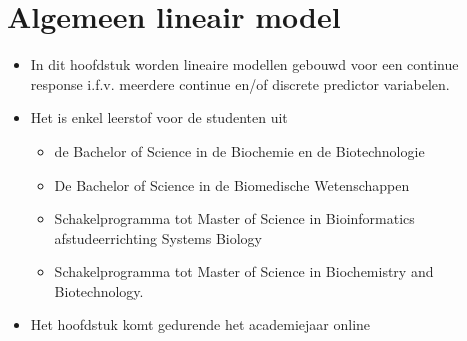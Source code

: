 \documentclass[12pt,dutch,coursenotes]{book}
\providecommand{\tightlist}{%
  \setlength{\itemsep}{0pt}\setlength{\parskip}{0pt}}
\theoremstyle{definition}
\theoremstyle{definition}
\theoremstyle{definition}
\theoremstyle{remark}
\begin{document}
\chapter{Algemeen lineair model}\label{chap:glm}

\begin{itemize}
\tightlist
\item
  In dit hoofdstuk worden lineaire modellen gebouwd voor een continue
  response i.f.v. meerdere continue en/of discrete predictor variabelen.
\item
  Het is enkel leerstof voor de studenten uit

  \begin{itemize}
  \tightlist
  \item
    de Bachelor of Science in de Biochemie en de Biotechnologie
  \item
    De Bachelor of Science in de Biomedische Wetenschappen
  \item
    Schakelprogramma tot Master of Science in Bioinformatics
    afstudeerrichting Systems Biology
  \item
    Schakelprogramma tot Master of Science in Biochemistry and
    Biotechnology.
  \end{itemize}
\item
  Het hoofdstuk komt gedurende het academiejaar online
\end{itemize}


\end{document}

